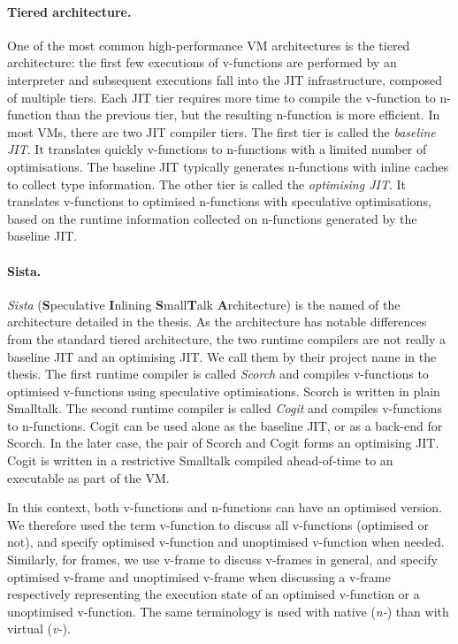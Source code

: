 \documentclass[a4paper,12pt,twoside]{../includes/ThesisStyle}
\begin{document}
\paragraph{Tiered architecture.} One of the most common high-performance VM architectures is the tiered architecture: the first few executions of v-functions are performed by an interpreter and subsequent executions fall into the JIT infrastructure, composed of multiple tiers. Each JIT tier requires more time to compile the v-function to n-function than the previous tier, but the resulting n-function is more efficient. In most VMs, there are two JIT compiler tiers. The first tier is called the \emph{baseline JIT}. It translates quickly v-functions to n-functions with a limited number of optimisations. The baseline JIT typically generates n-functions with inline caches to collect type information. The other tier is called the \emph{optimising JIT}. It translates v-functions to optimised n-functions with speculative optimisations, based on the runtime information collected on n-functions generated by the baseline JIT.

\paragraph{Sista.} \emph{Sista} (\textbf{S}peculative \textbf{I}nlining \textbf{S}mall\textbf{T}alk \textbf{A}rchitecture) is the named of the architecture detailed in the thesis. As the architecture has notable differences from the standard tiered architecture, the two runtime compilers are not really a baseline JIT and an optimising JIT. We call them by their project name in the thesis. The first runtime compiler is called \emph{Scorch} and compiles v-functions to optimised v-functions using speculative optimisations. Scorch is written in plain Smalltalk. The second runtime compiler is called \emph{Cogit} and compiles v-functions to n-functions. Cogit can be used alone as the baseline JIT, or as a back-end for Scorch. In the later case, the pair of Scorch and Cogit forms an optimising JIT. Cogit is written in a restrictive Smalltalk compiled ahead-of-time to an executable as part of the VM.

In this context, both v-functions and n-functions can have an optimised version. We therefore used the term v-function to discuss all v-functions (optimised or not), and specify optimised v-function and unoptimised v-function when needed. Similarly, for frames, we use v-frame to discuss v-frames in general, and specify optimised v-frame and unoptimised v-frame when discussing a v-frame respectively representing the execution state of an optimised v-function or a unoptimised v-function. The same terminology is used with native (\emph{n-}) than with virtual (\emph{v-}).
\end{document}
